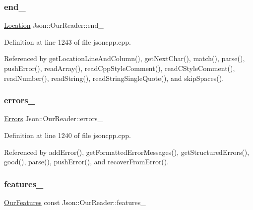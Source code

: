 \subsubsection{\texorpdfstring{end\+\_\+}{end\_}}
{\footnotesize\ttfamily \hyperlink{class_json_1_1_our_reader_a1bdc7bbc52ba87cae6b19746f2ee0189}{Location} Json\+::\+Our\+Reader\+::end\+\_\+\hspace{0.3cm}{\ttfamily [private]}}



Definition at line 1243 of file jsoncpp.\+cpp.



Referenced by get\+Location\+Line\+And\+Column(), get\+Next\+Char(), match(), parse(), push\+Error(), read\+Array(), read\+Cpp\+Style\+Comment(), read\+C\+Style\+Comment(), read\+Number(), read\+String(), read\+String\+Single\+Quote(), and skip\+Spaces().

\mbox{\label{class_json_1_1_our_reader_afb76b68ba1ab68fe09cf2838e3d4898d}} 
\subsubsection{\texorpdfstring{errors\+\_\+}{errors\_}}
{\footnotesize\ttfamily \hyperlink{class_json_1_1_our_reader_a8cc69593ef7303e58e99bb5dbb767562}{Errors} Json\+::\+Our\+Reader\+::errors\+\_\+\hspace{0.3cm}{\ttfamily [private]}}



Definition at line 1240 of file jsoncpp.\+cpp.



Referenced by add\+Error(), get\+Formatted\+Error\+Messages(), get\+Structured\+Errors(), good(), parse(), push\+Error(), and recover\+From\+Error().

\mbox{\label{class_json_1_1_our_reader_a2714302d5cc54ca2ce4118ea51c0397a}} 
\subsubsection{\texorpdfstring{features\+\_\+}{features\_}}
{\footnotesize\ttfamily \hyperlink{class_json_1_1_our_features}{Our\+Features} const Json\+::\+Our\+Reader\+::features\+\_\+\hspace{0.3cm}{\ttfamily [private]}}



